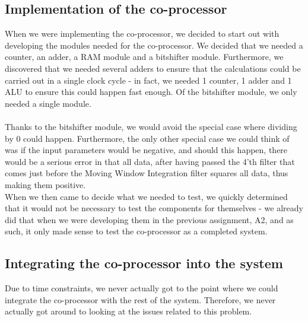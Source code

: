 \documentclass[12pt,a4paper]{article}
\begin{document}
\subsection{Implementation of the co-processor}
	When we were implementing the co-processor, we decided to start out with developing the modules needed for the co-processor. We decided that we needed a counter, an adder, a RAM module and a bitshifter module. Furthermore, we discovered that we needed several adders to ensure that the calculations could be carried out in a single clock cycle - in fact, we needed 1 counter, 1 adder and 1 ALU to ensure this could happen fast enough. Of the bitshifter module, we only needed a single module.\\
	\\
	Thanks to the bitshifter module, we would avoid the special case where dividing by 0 could happen. Furthermore, the only other special case we could think of was if the input parameters would be negative, and should this happen, there would be a serious error in that all data, after having passed the 4'th filter that comes just before the Moving Window Integration filter squares all data, thus making them positive.\\
	When we then came to decide what we needed to test, we quickly determined that it would not be necessary to test the components for themselves - we already did that when we were developing them in the previous assignment, A2, and as such, it only made sense to test the co-processor as a completed system.\\		
\subsection{Integrating the co-processor into the system}
	Due to time constraints, we never actually got to the point where we could integrate the co-processor with the rest of the system. Therefore, we never actually got around to looking at the issues related to this problem.
\end{document}
